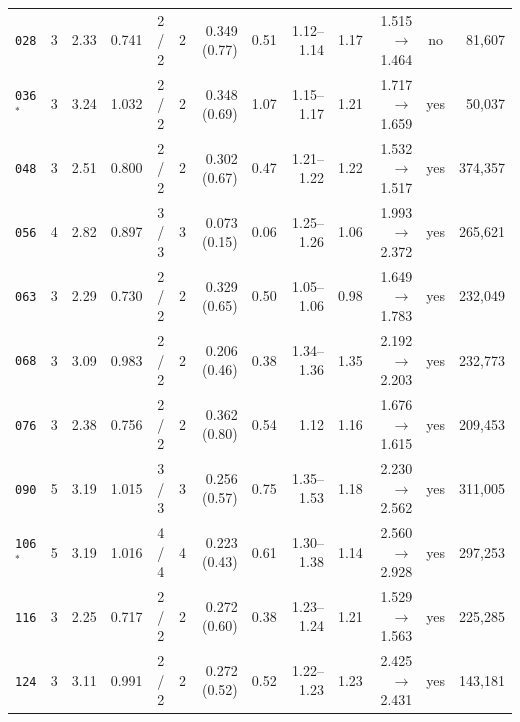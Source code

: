 {{\begin{table}[ht]
\begin{tabular}{lrrrcrrrrrrcr}
\texttt{028} & 3 & 2.33 & 0.741 & 2 / 2 & 2 & 0.349 (0.77) & 0.51 & 1.12--1.14 & 1.17 & 1.515 $\to$ 1.464 & no & 81{,}607\\
\texttt{036}$^*$ & 3 & 3.24 & 1.032 & 2 / 2 & 2 & 0.348 (0.69) & 1.07 & 1.15--1.17 & 1.21 & 1.717 $\to$ 1.659 & yes & 50{,}037\\
\texttt{048} & 3 & 2.51 & 0.800 & 2 / 2 & 2 & 0.302 (0.67) & 0.47 & 1.21--1.22 & 1.22 & 1.532 $\to$ 1.517 & yes & 374{,}357\\
\texttt{056} & 4 & 2.82 & 0.897 & 3 / 3 & 3 & 0.073 (0.15) & 0.06 & 1.25--1.26 & 1.06 & 1.993 $\to$ 2.372 & yes & 265{,}621\\
\texttt{063} & 3 & 2.29 & 0.730 & 2 / 2 & 2 & 0.329 (0.65) & 0.50 & 1.05--1.06 & 0.98 & 1.649 $\to$ 1.783 & yes & 232{,}049\\
\texttt{068} & 3 & 3.09 & 0.983 & 2 / 2 & 2 & 0.206 (0.46) & 0.38 & 1.34--1.36 & 1.35 & 2.192 $\to$ 2.203 & yes & 232{,}773\\
\texttt{076} & 3 & 2.38 & 0.756 & 2 / 2 & 2 & 0.362 (0.80) & 0.54 & 1.12 & 1.16 & 1.676 $\to$ 1.615 & yes & 209{,}453\\
\texttt{090} & 5 & 3.19 & 1.015 & 3 / 3 & 3 & 0.256 (0.57) & 0.75 & 1.35--1.53 & 1.18 & 2.230 $\to$ 2.562 & yes & 311{,}005\\
\texttt{106}$^*$ & 5 & 3.19 & 1.016 & 4 / 4 & 4 & 0.223 (0.43) & 0.61 & 1.30--1.38 & 1.14 & 2.560 $\to$ 2.928 & yes & 297{,}253\\
\texttt{116} & 3 & 2.25 & 0.717 & 2 / 2 & 2 & 0.272 (0.60) & 0.38 & 1.23--1.24 & 1.21 & 1.529 $\to$ 1.563 & yes & 225{,}285\\
\texttt{124} & 3 & 3.11 & 0.991 & 2 / 2 & 2 & 0.272 (0.52) & 0.52 & 1.22--1.23 & 1.23 & 2.425 $\to$ 2.431 & yes & 143{,}181\\
\bottomrule
\end{tabular}
\end{table}%
}}
